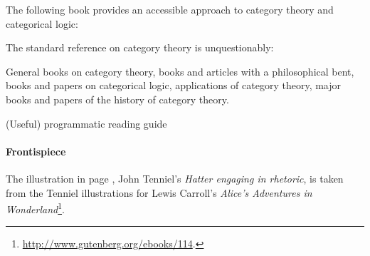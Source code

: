 

The following book provides an accessible approach to category theory
and categorical logic: \parencite{awodey-2010}

The standard reference on category theory is unquestionably:
\parencite{maclane-1998}

General books on category theory, books and articles with a
philosophical bent, books and papers on categorical logic,
applications of category theory, major books and papers of the history
of category theory.

\parencites{eilenberg-maclane-1942}{eilenberg-maclane-1945}

\parencite[48--56]{marquis-2013} (Useful) programmatic reading guide

\parencite{bird-demoor-1997}

\parencite{lipovaca-2011}
\parencite{osullivan-2008}

\parencite{elkins-2009}
\parencite{yorgey-2009}


\paragraph{Frontispiece}

The illustration in page \pageref{fig:hatter}, John Tenniel's
\emph{Hatter engaging in rhetoric}, is taken from the Tenniel
illustrations for Lewis Carroll's \emph{Alice's Adventures in
  Wonderland}\footnote{\url{http://www.gutenberg.org/ebooks/114}.}.

\nocite{*}

\clearemptydoublepage
